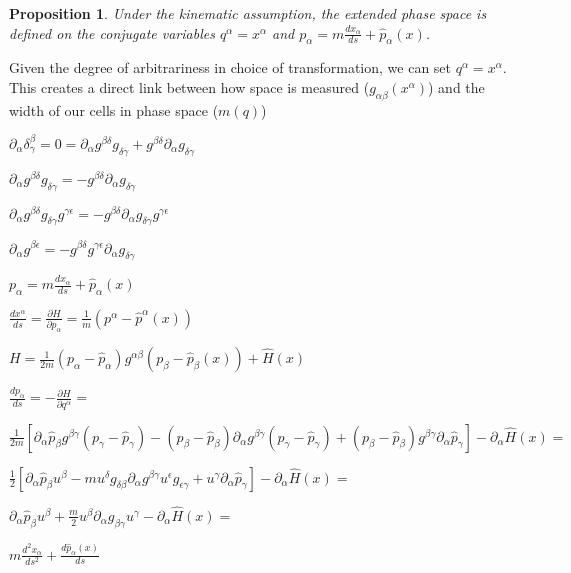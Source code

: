 \documentclass[aps,pra,10pt,twocolumn,floatfix,nofootinbib]{revtex4-1}
\newtheorem{prop}[thm]{Proposition}
\theoremstyle{definition}
\begin{document}
\begin{prop}\label{continuousLabels}
Under the kinematic assumption, the extended phase space is defined on the conjugate variables $q^\alpha=x^\alpha$ and $p_\alpha=m\frac{dx_\alpha}{ds}+\hat{p}_\alpha(x)$.
\end{prop}

Given the degree of arbitrariness in choice of transformation, we can set $q^\alpha=x^\alpha$. This creates a direct link between how space is measured ($g_{\alpha\beta}(x^\alpha)$) and the width of our cells in phase space ($m(q)$)

$\partial_\alpha \delta^\beta_\gamma = 0 = \partial_\alpha g^{\beta\delta} g_{\delta\gamma} + g^{\beta\delta} \partial_\alpha g_{\delta\gamma}$

$\partial_\alpha g^{\beta\delta} g_{\delta\gamma} = - g^{\beta\delta} \partial_\alpha g_{\delta\gamma}$

$\partial_\alpha g^{\beta\delta} g_{\delta\gamma} g^{\gamma\epsilon} = - g^{\beta\delta} \partial_\alpha g_{\delta\gamma} g^{\gamma\epsilon}$

$\partial_\alpha g^{\beta\epsilon} = - g^{\beta\delta} g^{\gamma\epsilon} \partial_\alpha g_{\delta\gamma} $

$p_\alpha=m\frac{dx_\alpha}{ds}+\hat{p}_\alpha(x)$


$\frac{dx^\alpha}{ds}=\frac{\partial H}{\partial p_\alpha}=\frac{1}{m}(p^\alpha-\hat{p}^\alpha(x))$

$H=\frac{1}{2m}(p_\alpha-\hat{p}_\alpha)g^{\alpha\beta}(p_\beta-\hat{p}_\beta(x))+\hat{H}(x)$

$\frac{dp_\alpha}{ds}=-\frac{\partial H}{\partial q^\alpha}=$

$\frac{1}{2m}[\partial_\alpha \hat{p}_\beta g^{\beta \gamma} (p_\gamma -\hat{p}_\gamma)
 - (p_\beta -\hat{p}_\beta) \partial_\alpha g^{\beta \gamma} (p_\gamma -\hat{p}_\gamma)
 + (p_\beta -\hat{p}_\beta) g^{\beta \gamma} \partial_\alpha \hat{p}_\gamma ]- \partial_\alpha \hat{H}(x)=$

$\frac{1}{2}[\partial_\alpha \hat{p}_\beta u^\beta
- m u^\delta g_{\delta\beta} \partial_\alpha g^{\beta \gamma} u^\epsilon g_{\epsilon\gamma}
+ u^\gamma \partial_\alpha \hat{p}_\gamma ]- \partial_\alpha \hat{H}(x)=$

$\partial_\alpha \hat{p}_\beta u^\beta + \frac{m}{2}u^\beta \partial_\alpha g_{\beta \gamma} u^\gamma
- \partial_\alpha \hat{H}(x)=$

$m\frac{d^2x_\alpha}{ds^2}+\frac{d\hat{p}_\alpha(x)}{ds}$
\end{document}

